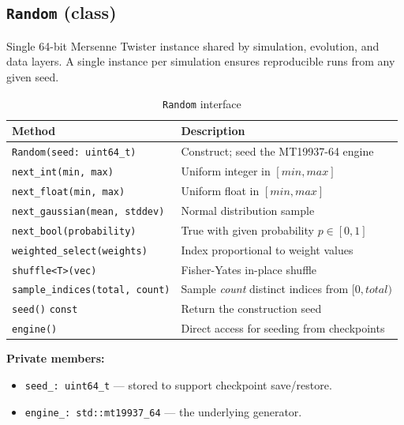 \subsection{\texttt{Random} (class)}

Single 64-bit Mersenne Twister instance shared by simulation, evolution, and data layers.
A single instance per simulation ensures reproducible runs from any given seed.

\begin{table}[H]
\centering\small
\caption{\texttt{Random} interface}
\begin{tabularx}{\textwidth}{@{}lX@{}}
\toprule
\textbf{Method} & \textbf{Description} \\
\midrule
\texttt{Random(seed: uint64\_t)} & Construct; seed the MT19937-64 engine \\
\texttt{next\_int(min, max)} & Uniform integer in $[\mathit{min}, \mathit{max}]$ \\
\texttt{next\_float(min, max)} & Uniform float in $[\mathit{min}, \mathit{max}]$ \\
\texttt{next\_gaussian(mean, stddev)} & Normal distribution sample \\
\texttt{next\_bool(probability)} & True with given probability $p\in[0,1]$ \\
\texttt{weighted\_select(weights)} & Index proportional to weight values \\
\texttt{shuffle<T>(vec)} & Fisher-Yates in-place shuffle \\
\texttt{sample\_indices(total, count)} & Sample \emph{count} distinct indices from $[0,\mathit{total})$ \\
\texttt{seed()} \texttt{const} & Return the construction seed \\
\texttt{engine()} & Direct access for seeding from checkpoints \\
\bottomrule
\end{tabularx}
\end{table}

\textbf{Private members:}
\begin{itemize}[nosep]
  \item \texttt{seed\_: uint64\_t} — stored to support checkpoint save/restore.
  \item \texttt{engine\_: std::mt19937\_64} — the underlying generator.
\end{itemize}

